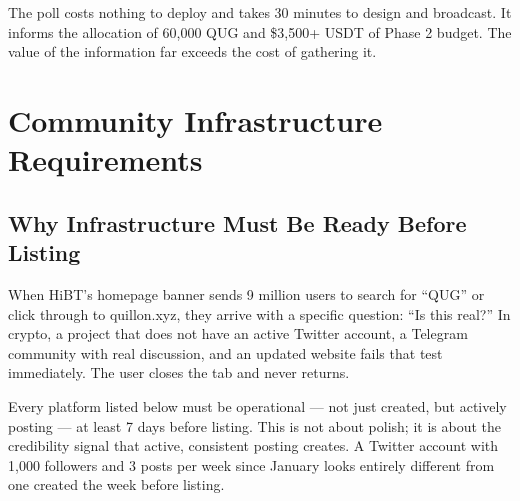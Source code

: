 \documentclass[11pt,a4paper]{article}
\begin{document}
The poll costs nothing to deploy and takes 30 minutes to design and broadcast. It informs the allocation of 60,000 QUG and \$3,500+ USDT of Phase 2 budget. The value of the information far exceeds the cost of gathering it.

\section{Community Infrastructure Requirements}

\subsection{Why Infrastructure Must Be Ready Before Listing}

When HiBT's homepage banner sends 9 million users to search for ``QUG'' or click through to quillon.xyz, they arrive with a specific question: ``Is this real?'' In crypto, a project that does not have an active Twitter account, a Telegram community with real discussion, and an updated website fails that test immediately. The user closes the tab and never returns.

Every platform listed below must be operational — not just created, but actively posting — at least 7 days before listing. This is not about polish; it is about the credibility signal that active, consistent posting creates. A Twitter account with 1,000 followers and 3 posts per week since January looks entirely different from one created the week before listing.
\end{document}
